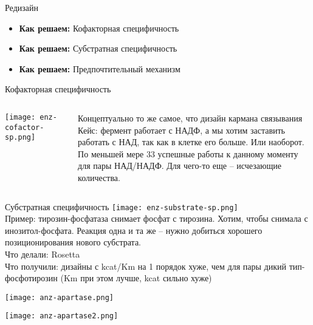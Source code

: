 \begin{frame}{Редизайн}
    \Large
\begin{itemize}
    \item \textbf{Как решаем:} Кофакторная специфичность
    \item \textbf{Как решаем:} Субстратная специфичность
    \item \textbf{Как решаем:} Предпочтительный механизм
\end{itemize}
\end{frame}

\begin{frame}{Кофакторная специфичность}
\begin{columns}
\begin{column}{0.5\textwidth}
    \texttt{[image: enz-cofactor-sp.png]}
\end{column}
\begin{column}{0.5\textwidth}
    Концептуально то же самое, что дизайн кармана связывания\\
Кейс: фермент работает с НАДФ, а мы хотим заставить работать с НАД, так как в клетке его больше. Или наоборот.\\
По меньшей мере 33 успешные работы к данному моменту для пары НАД/НАДФ. Для чего-то еще – исчезающие количества.
\end{column}
\end{columns}
\end{frame}


\begin{frame}{Субстратная специфичность}
    \texttt{[image: enz-substrate-sp.png]}\\
Пример: тирозин-фосфатаза снимает фосфат с тирозина. Хотим, чтобы снимала с инозитол-фосфата. Реакция одна и та же – нужно добиться хорошего
позиционирования нового субстрата.\\
Что делали: Rosetta \\
Что получили: дизайны с kcat/Km на 1 порядок хуже, чем для пары дикий тип-фосфотирозин (Km при этом лучше, kcat сильно хуже)\\
\end{frame}


\begin{frame}[plain]
\texttt{[image: anz-apartase.png]}
\end{frame}
\begin{frame}[plain]
\texttt{[image: anz-apartase2.png]}
\end{frame}


